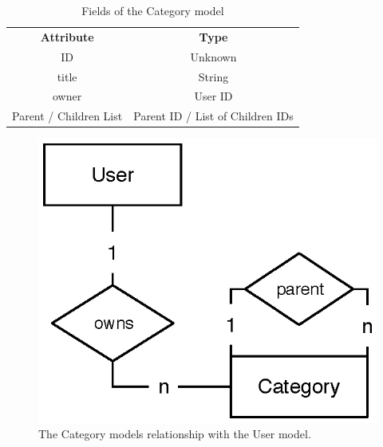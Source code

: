 			\begin{table}[p]
				\centering
				\begin{tabular}{c|c}
					\textbf{Attribute} 		& \textbf{Type} 		\\
					ID 						& Unknown 	\\
					title 					& String 	\\
					owner 					& User ID 	\\
					Parent / Children List 	& Parent ID / List of Children IDs 	\\
				\end{tabular}
				\caption{Fields of the Category model}
				\label{fig:model:category}
			\end{table}
			\begin{figure}[p]
				\centering
				\includegraphics[scale=0.75]{figures/design/uml/user-category-relation.eps}
				\caption{The Category models relationship with the User model.}
				\label{fig:relationship:category-user}
			\end{figure}



